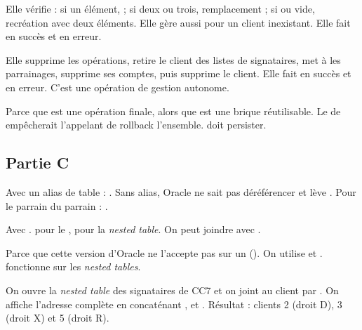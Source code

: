 {Elle vérifie  : si un élément,  ; si deux ou trois,
remplacement ; si  ou vide, recréation avec deux éléments.}
{Elle gère aussi  pour un client inexistant. Elle fait
 en succès et  en erreur.}

{Elle supprime les opérations, retire le client des listes de signataires, met
à  les parrainages, supprime ses comptes, puis supprime le client.}
{Elle fait  en succès et  en erreur. C'est une
opération de gestion autonome.}

{Parce que  est une opération finale, alors que
 est une brique réutilisable.}
{Le  de  empêcherait l'appelant de rollback
l'ensemble.  doit persister.}

\subsection{Partie C}

{Avec un alias de table : .}
{Sans alias, Oracle ne sait pas déréférencer et lève . Pour le
parrain du parrain : .}

{Avec .}
{ pour le ,
 pour la \emph{nested table}. On peut joindre avec
.}

{Parce que cette version d'Oracle ne l'accepte pas sur un 
().}
{On utilise  et . 
fonctionne sur les \emph{nested tables}.}

{On ouvre la \emph{nested table} des signataires de CC7 et on joint au client
par .}
{On affiche l'adresse complète en concaténant ,
 et . Résultat : clients 2 (droit D),
3 (droit X) et 5 (droit R).}

